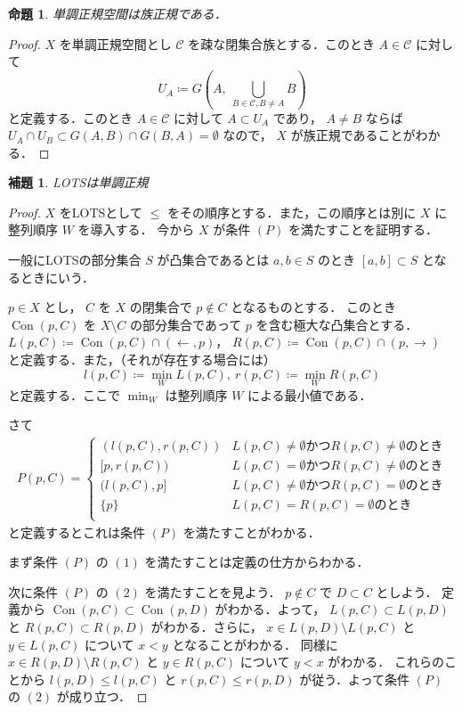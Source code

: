 \documentclass[leqno, 12pt]{ltjsarticle}
\newtheorem{prop}[thm]{命題}
\newtheorem{lem}[thm]{補題}
\DeclareMathOperator{\Con}{Con}
\begin{document}
\begin{prop}
単調正規空間は族正規である．
\end{prop}
\begin{proof}
$X$
を単調正規空間とし
$\mathcal{C}$
を疎な閉集合族とする．このとき
$A\in \mathcal{C}$
に対して
\[
U_{A}\coloneqq G\left(A, \ \bigcup_{B\in \mathcal{C}, B\neq A}B\right)
\]
と定義する．このとき
$A\in \mathcal{C}$
に対して
$A\subset U_{A}$
であり，
$A\neq B$
ならば
$U_{A}\cap U_{B}\subset G(A,B)\cap G(B,A)=\emptyset$
なので，
$X$
が族正規であることがわかる．
\end{proof}

\begin{lem}
LOTSは単調正規
\end{lem}
\begin{proof}
$X$
をLOTSとして
$\le $
をその順序とする．また，この順序とは別に
$X$
に整列順序
$W$
を導入する．
 今から
 $X$
 が条件
 $(P)$
 を満たすことを証明する．

 一般にLOTSの部分集合
 $S$
 が凸集合であるとは
 $a,b\in S$
 のとき
 $[a,b]\subset S$
 となるときにいう．

 $p\in X$
 とし，
 $C$
 を
 $X$
 の閉集合で
 $p\notin C$
 となるものとする．
 このとき
 $\Con(p,C)$
 を
 $X\setminus C$
 の部分集合であって
 $p$
 を含む極大な凸集合とする．
 $L(p,C)\coloneqq \Con(p,C)\cap(\gets, p)$，
 $R(p,C)\coloneqq \Con(p,C)\cap (p,\to)$
 と定義する．また，（それが存在する場合には）
 \[
 l(p, C)\coloneqq\min_{W}L(p,C),\ r(p,C)\coloneqq\min_{W}R(p,C)
 \]
 と定義する．ここで
 $\min_{W}$
 は整列順序
 $W$
 による最小値である．

 さて
 \begin{align*}
 P(p, C)=
 \begin{cases}
 (l(p,C), r(p, C))& \text{$L(p,C)\neq\emptyset$かつ$R(p, C)\neq\emptyset$のとき}\\
 [p, r(p, C)) & \text{$L(p,C)=\emptyset$かつ$R(p, C)\neq\emptyset$のとき}\\
 (l(p,C),p] &\text{$L(p,C)\neq\emptyset$かつ$R(p, C)=\emptyset$のとき}\\
 \{p\} &\text{$L(p,C)=R(p, C)=\emptyset$のとき}\\
 \end{cases}
 \end{align*}
 と定義するとこれは条件
 $(P)$
 を満たすことがわかる．

 まず条件
 $(P)$
 の
 $(1)$
 を満たすことは定義の仕方からわかる．

 次に条件
 $(P)$
 の
 $(2)$
 を満たすことを見よう．
 $p\notin C$
 で
 $D\subset C$
 としよう．
 定義から
 $\Con(p, C)\subset \Con(p, D)$
 がわかる．よって，
 $L(p, C)\subset L(p, D)$
 と
 $R(p,C)\subset R(p, D)$
 がわかる．さらに，
 $x\in L(p, D)\setminus L(p,C)$
 と
 $y\in L(p,C)$
 について
 $x<y$
 となることがわかる．
 同様に
 $x\in R(p, D)\setminus R(p,C)$
 と
 $y\in R(p,C)$
 について
 $y<x$
 がわかる．
 これらのことから
$l(p, D)\le l(p,C)$
と
$r(p, C)\le r(p,D)$
 が従う．よって条件
 $(P)$
 の
 $(2)$
 が成り立つ．


\end{proof}
\end{document}
